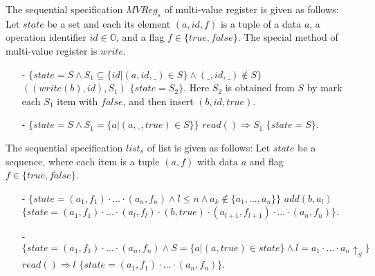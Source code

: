 \begin{example}
\label{definition:sequential specification of multi-value register}
The sequential specification $\mathit{MVReg}_s$ of multi-value register is given as follows: Let $\mathit{state}$ be a set and each its element $(a,\mathit{id},f)$ is a tuple of a data $a$, a operation identifier $\mathit{id} \in \mathbb{O}$, and a flag $f \in \{ \mathit{true},\mathit{false} \}$. The special method of multi-value register is $\mathit{write}$.
\begin{itemize}
\setlength{\itemsep}{0.5pt}
\item[-] $\{ \mathit{state} = S \wedge S_1 \subseteq \{\mathit{id} \vert (a,\mathit{id},\_) \in S\} \wedge (\_,\mathit{id},\_) \notin S \}$ $((write(b),id),S_1)$ $\{ \mathit{state} = S_2 \}$. Here $S_2$ is obtained from $S$ by mark each $S_1$ item with $\mathit{false}$, and then insert $(b,id,\mathit{true})$.
\item[-] $\{ \mathit{state} = S \wedge S_1 = \{ a \vert (a,\_,\mathit{true}) \in S \} \}$ $read() \Rightarrow S_1$ $\{ \mathit{state} = S \}$.
\end{itemize}
\end{example}


\begin{example}
\label{definition:sequential specification of list with add-after interface}
The sequential specification $\mathit{list}_s$ of list is given as follows: Let $\mathit{state}$ be a sequence, where each item is a tuple $(a,f)$ with data $a$ and flag $f \in \{ \mathit{true},\mathit{false} \}$. 
\begin{itemize}
\setlength{\itemsep}{0.5pt}
\item[-] $\{ \mathit{state} = (a_1,f_1) \cdot \ldots \cdot (a_n,f_n) \wedge l \leq n \wedge a_k \notin \{ a_1, \ldots, a_n \} \}$ $add(b,a_l)$ $\{ \mathit{state} = (a_1,f_1) \cdot \ldots \cdot (a_l,f_l) \cdot (b,\mathit{true}) \cdot (a_{l+1},f_{l+1}) \cdot \ldots \cdot (a_n,f_n) \}$.
\item[-] $\{ \mathit{state} = (a_1,f_1) \cdot \ldots \cdot (a_n,f_n) \wedge S = \{ a \vert (a,\mathit{true}) \in \mathit{state} \} \wedge l = a_1 \cdot \ldots \cdot a_n \uparrow_{S} \}$ $read() \Rightarrow l$ $\{ \mathit{state} = (a_1,f_1) \cdot \ldots \cdot (a_n,f_n) \}$.
\end{itemize}
\end{example}


